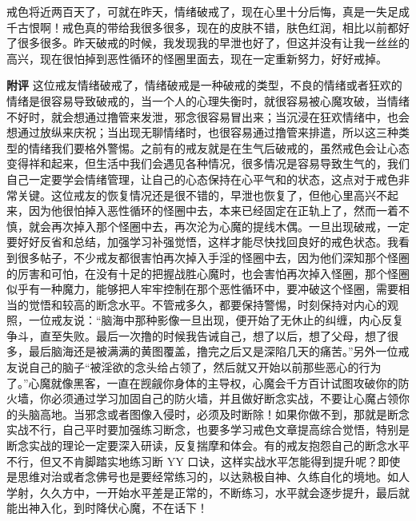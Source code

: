 \begin{case}
    戒色将近两百天了，可就在昨天，情绪破戒了，现在心里十分后悔，真是一失足成千古恨啊！戒色真的带给我很多很多，现在的皮肤不错，肤色红润，相比以前都好了很多很多。昨天破戒的时候，我发现我的早泄也好了，但这并没有让我一丝丝的高兴，现在很怕掉到恶性循环的怪圈里面去，现在一定重新努力，好好戒掉。

    \textbf{附评} 这位戒友情绪破戒了，情绪破戒是一种破戒的类型，不良的情绪或者狂欢的情绪是很容易导致破戒的，当一个人的心理失衡时，就很容易被心魔攻破，当情绪不好时，就会想通过撸管来发泄，邪念很容易冒出来；当沉浸在狂欢情绪中，也会想通过放纵来庆祝；当出现无聊情绪时，也很容易通过撸管来排遣，所以这三种类型的情绪我们要格外警惕。之前有的戒友就是在生气后破戒的，虽然戒色会让心态变得祥和起来，但生活中我们会遇见各种情况，很多情况是容易导致生气的，我们自己一定要学会情绪管理，让自己的心态保持在心平气和的状态，这点对于戒色非常关键。这位戒友的恢复情况还是很不错的，早泄也恢复了，但他心里高兴不起来，因为他很怕掉入恶性循环的怪圈中去，本来已经固定在正轨上了，然而一着不慎，就会再次掉入那个怪圈中去，再次沦为心魔的提线木偶。一旦出现破戒，一定要好好反省和总结，加强学习补强觉悟，这样才能尽快找回良好的戒色状态。我看到很多帖子，不少戒友都很害怕再次掉入手淫的怪圈中去，因为他们深知那个怪圈的厉害和可怕，在没有十足的把握战胜心魔时，也会害怕再次掉入怪圈，那个怪圈似乎有一种魔力，能够把人牢牢控制在那个恶性循环中，要冲破这个怪圈，需要相当的觉悟和较高的断念水平。不管戒多久，都要保持警惕，时刻保持对内心的观照，一位戒友说：“脑海中那种影像一旦出现，便开始了无休止的纠缠，内心反复争斗，直至失败。最后一次撸的时候我告诫自己，想了以后，想了父母，想了很多，最后脑海还是被满满的黄图覆盖，撸完之后又是深陷几天的痛苦。”另外一位戒友说自己的脑子“被淫欲的念头给占领了，然后就又开始以前那些恶心的行为了。”心魔就像黑客，一直在觊觎你身体的主导权，心魔会千方百计试图攻破你的防火墙，你必须通过学习加固自己的防火墙，并且做好断念实战，不要让心魔占领你的头脑高地。当邪念或者图像入侵时，必须及时断除！如果你做不到，那就是断念实战不行，自己平时要加强练习断念，也要多学习戒色文章提高综合觉悟，特别是断念实战的理论一定要深入研读，反复揣摩和体会。有的戒友抱怨自己的断念水平不行，但又不肯脚踏实地练习断 YY 口诀，这样实战水平怎能得到提升呢？即使是思维对治或者念佛号也是要经常练习的，以达熟极自神、久练自化的境地。如人学射，久久方中，一开始水平差是正常的，不断练习，水平就会逐步提升，最后就能出神入化，到时降伏心魔，不在话下！
\end{case}

